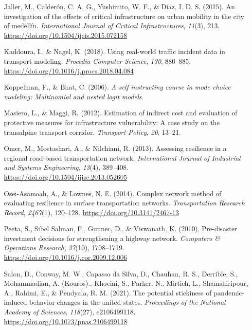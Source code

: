 \documentclass[
  letterpaper,
  number,
  review,
  3p]{elsarticle}
\newlength{\cslhangindent}
\newlength{\cslentryspacingunit} %
\newenvironment{CSLReferences}[2] %
 {%
  \setlength{\parindent}{0pt}
  \ifodd #1
  \let\oldpar\par
  \def\par{\hangindent=\cslhangindent\oldpar}
  \fi
  \setlength{\parskip}{#2\cslentryspacingunit}
 }%
 {}
\begin{document}
\begin{CSLReferences}{1}{0}
\leavevmode{}%
Jaller, M., Calderón, C. A. G., Yushimito, W. F., \& Díaz, I. D. S.
(2015). An investigation of the effects of critical infrastructure on
urban mobility in the city of medellín. \emph{International Journal of
Critical Infrastructures}, \emph{11}(3), 213.
\url{https://doi.org/10.1504/ijcis.2015.072158}

\leavevmode{}%
Kaddoura, I., \& Nagel, K. (2018). Using real-world traffic incident
data in transport modeling. \emph{Procedia Computer Science},
\emph{130}, 880--885. \url{https://doi.org/10.1016/j.procs.2018.04.084}

\leavevmode{}%
Koppelman, F., \& Bhat, C. (2006). \emph{A self instructing course in
mode choice modeling: Multinomial and nested logit models}.

\leavevmode{}%
Masiero, L., \& Maggi, R. (2012). Estimation of indirect cost and
evaluation of protective measures for infrastructure vulnerability: A
case study on the transalpine transport corridor. \emph{Transport
Policy}, \emph{20}, 13--21.

\leavevmode{}%
Omer, M., Mostashari, A., \& Nilchiani, R. (2013). Assessing resilience
in a regional road-based transportation network. \emph{International
Journal of Industrial and Systems Engineering}, \emph{13}(4), 389--408.
\url{https://doi.org/10.1504/ijise.2013.052605}

\leavevmode{}%
Osei-Asamoah, A., \& Lownes, N. E. (2014). Complex network method of
evaluating resilience in surface transportation networks.
\emph{Transportation Research Record}, \emph{2467}(1), 120--128.
\url{https://doi.org/10.3141/2467-13}

\leavevmode{}%
Peeta, S., Sibel Salman, F., Gunnec, D., \& Viswanath, K. (2010).
Pre-disaster investment decisions for strengthening a highway network.
\emph{Computers \& Operations Research}, \emph{37}(10), 1708--1719.
\url{https://doi.org/10.1016/j.cor.2009.12.006}

\leavevmode{}%
Salon, D., Conway, M. W., Capasso da Silva, D., Chauhan, R. S.,
Derrible, S., Mohammadian, A. (Kouros)., Khoeini, S., Parker, N.,
Mirtich, L., Shamshiripour, A., Rahimi, E., \& Pendyala, R. M. (2021).
The potential stickiness of pandemic-induced behavior changes in the
united states. \emph{Proceedings of the National Academy of Sciences},
\emph{118}(27), e2106499118.
\url{https://doi.org/10.1073/pnas.2106499118}


\end{CSLReferences}
\end{document}
